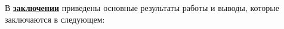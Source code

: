 В \underline{\textbf{заключении}} приведены основные результаты работы и выводы, которые заключаются в следующем:




